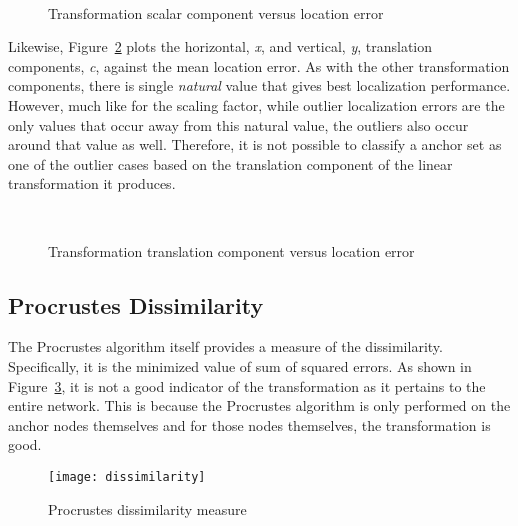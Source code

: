 \begin{figure}
  \centering
\\
	\caption{Transformation scalar component versus location error}	
	\label{fig:scalar}
\end{figure}

Likewise, Figure~\ref{fig:translate} plots the horizontal, \emph{x}, and vertical, \emph{y}, translation components, \emph{c}, against the mean location error. As with the other transformation components, there is single \emph{natural} value that gives best localization performance.  However, much like for the scaling factor, while outlier localization errors are the only values that occur away from this natural value, the outliers also occur around that value as well.  Therefore, it is not possible to classify a anchor set as one of the outlier cases based on the translation component of the linear transformation it produces.

\begin{figure}
  \centering
\\
	\caption{Transformation translation component versus location error}	
	\label{fig:translate}
\end{figure}

\subsection{Procrustes Dissimilarity}

The Procrustes algorithm itself provides a measure of the dissimilarity.  Specifically, it is the minimized value of sum of squared errors\cite{procrustes-matlab}.  As shown in Figure~\ref{fig:dissimilarity}, it is not a good indicator of the transformation as it pertains to the entire network.  This is because the Procrustes algorithm is only performed on the anchor nodes themselves and for those nodes themselves, the transformation is good.

\begin{figure}
  \centering
	\texttt{[image: dissimilarity]}
	\caption{Procrustes dissimilarity measure}	
	\label{fig:dissimilarity}
\end{figure}

